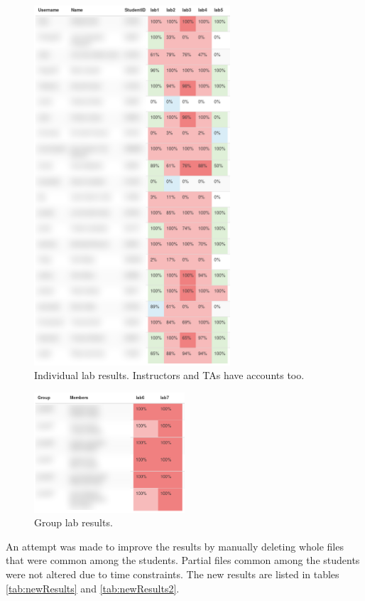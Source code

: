 \documentclass[10pt,journal,compsoc]{IEEEtran}
\begin{document}
		\begin{figure}[h!]
			\includegraphics[width=0.65\textwidth]{indlabresults.png}
			\caption{Individual lab results. Instructors and TAs have accounts too.}
			\label{fig:indlabresults}
		\end{figure}
		
		\begin{figure}[h!]
			\includegraphics[width=0.5\textwidth]{grouplabresults.png}
			\caption{Group lab results.}
			\label{fig:grouplabresults}
		\end{figure}
		
		An attempt was made to improve the results by manually deleting whole files that were common among the students. Partial files common among the students were not altered due to time constraints. The new results are listed in tables \ref{tab:newResults} and \ref{tab:newResults2}.
		
\end{document}
